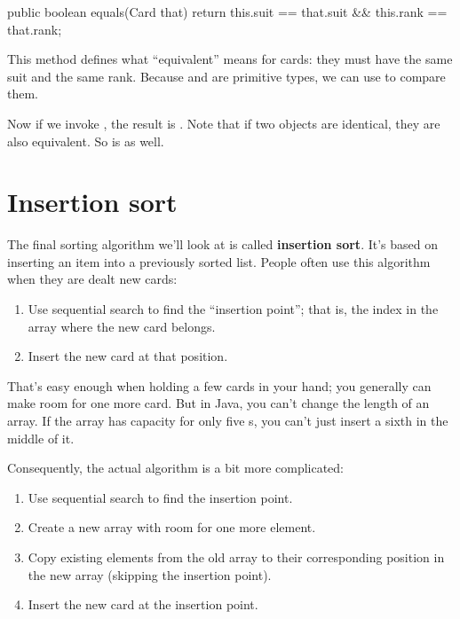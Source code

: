 
\begin{code}
public boolean equals(Card that) {
    return this.suit == that.suit && this.rank == that.rank;
}
\end{code}

This method defines what ``equivalent'' means for cards: they must have the same suit and the same rank.
Because  and  are primitive types, we can use \java{==} to compare them.

Now if we invoke , the result is .
Note that if two objects are identical, they are also equivalent.
So  is  as well.


\section{Insertion sort}
\label{insertion}


The final sorting algorithm we'll look at is called {\bf insertion sort}.
It's based on inserting an item into a previously sorted list.
People often use this algorithm when they are dealt new cards:

\begin{enumerate}
\item Use sequential search to find the ``insertion point''; that is, the index in the array where the new card belongs.
\item Insert the new card at that position.
\end{enumerate}

That's easy enough when holding a few cards in your hand; you generally can make room for one more card.
But in Java, you can't change the length of an array.
If the array has capacity for only five s, you can't just insert a sixth  in the middle of it.

Consequently, the actual algorithm is a bit more complicated:

\begin{enumerate}
\item Use sequential search to find the insertion point.
\item Create a new array with room for one more element.
\item Copy existing elements from the old array to their corresponding position in the new array (skipping the insertion point).
\item Insert the new card at the insertion point.
\end{enumerate}

